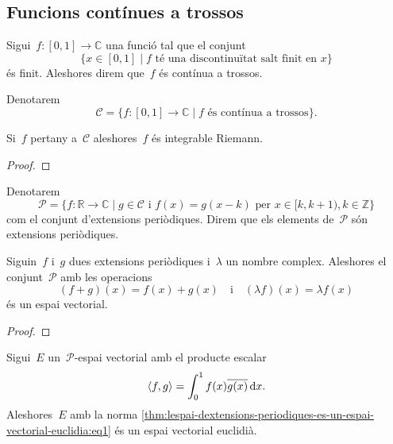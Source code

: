 \documentclass[../analisi-matematica.tex]{subfiles}
\begin{document}
    \subsection{Funcions contínues a trossos}
    \begin{definition}
        \label{def:funcio-continua-a-trossos}
        Sigui~\(f\colon[0,1]\longrightarrow\mathbb{C}\) una funció tal que el conjunt
        \[
            \{x\in[0,1]\mid f\text{ té una discontinuïtat salt finit en }x\}
        \]
        és finit.
        Aleshores direm que~\(f\) és contínua a trossos.

        Denotarem
        \[
            \mathcal{C}=\{f\colon[0,1]\longrightarrow\mathbb{C}\mid f\text{ és contínua a trossos}\}.
        \]
    \end{definition}
    \begin{observation}
        \label{obs:les-funcions-continues-a-trossos-son-integrables}
        Si~\(f\) pertany a~\(\mathcal{C}\) aleshores~\(f\) és integrable Riemann.
    \end{observation}
    \begin{proof}
    \end{proof}
    \begin{definition}
        \label{def:conjunt-dextensions-periodiques}
        Denotarem
        \label{def:extensio-periodica}
        \[
            \mathcal{P}=\{f\colon\mathbb{R}\longrightarrow\mathbb{C}\mid g\in\mathcal{C}\text{ i }f(x)=g(x-k)\text{ per }x\in[k,k+1),k\in\mathbb{Z}\}
        \]
        com el conjunt d'extensions periòdiques.
        Direm que els elements de~\(\mathcal{P}\) són extensions periòdiques.
    \end{definition}
    \begin{lemma}
        \label{lema:lespai-dextensions-periodiques-es-un-espai-vectorial}
        Siguin~\(f\) i~\(g\) dues extensions periòdiques i~\(\lambda\) un nombre complex.
        Aleshores el conjunt~\(\mathcal{P}\) amb les operacions
        \[
            (f+g)(x)=f(x)+g(x)\quad\text{i}\quad(\lambda f)(x)=\lambda f(x)
        \]
        és un espai vectorial.
    \end{lemma}
    \begin{proof}
    \end{proof}
    \begin{theorem}
        \label{thm:lespai-dextensions-periodiques-es-un-espai-vectorial-euclidia}
        Sigui~\(E\) un~\(\mathcal{P}\)-espai vectorial amb el producte escalar
        \begin{equation}
            \label{thm:lespai-dextensions-periodiques-es-un-espai-vectorial-euclidia:eq1}
            \langle f,g\rangle=\int_{0}^{1}f(x)\overline{g(x)}\mathop{}\!\mathrm{d} x.
        \end{equation}
        Aleshores~\(E\) amb la norma \eqref{thm:lespai-dextensions-periodiques-es-un-espai-vectorial-euclidia:eq1} és un espai vectorial euclidià.
    \end{theorem}
\end{document}
